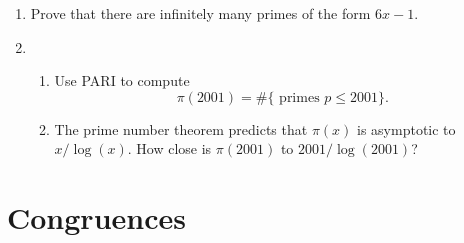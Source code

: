 \documentclass[11pt]{report}
\begin{document}
\begin{enumerate}
  \item Prove that there are infinitely many primes of the form $6x-1$.

  \item \begin{enumerate}
          \item Use PARI to compute
                $$\pi(2001) = \#\{ \text{ primes } p \leq 2001\}.$$

          \item The prime number theorem predicts that $\pi(x)$ is
                asymptotic to $x/\log(x)$.  How close is $\pi(2001)$ to
                $2001/\log(2001)$?
        \end{enumerate}

\end{enumerate}

\section{Congruences}
\end{document}
